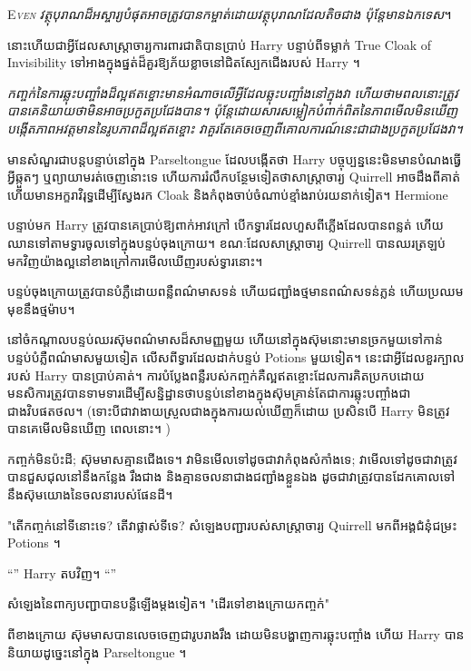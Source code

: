 
\lettrine{E}{\emph{ven}} \emph{វត្ថុបុរាណដ៏អស្ចារ្យបំផុតអាចត្រូវបានកម្ចាត់ដោយវត្ថុបុរាណដែលតិចជាង ប៉ុន្តែមានឯកទេស}។

នោះហើយជាអ្វីដែលសាស្រ្តាចារ្យការពារជាតិបានប្រាប់ Harry បន្ទាប់ពីទម្លាក់ True Cloak of Invisibility ទៅអាងក្នុងផ្នត់ដ៏គួរឱ្យភ័យខ្លាចនៅជិតស្បែកជើងរបស់ Harry ។

\emph{កញ្ចក់នៃការឆ្លុះបញ្ចាំងដ៏ល្អឥតខ្ចោះមានអំណាចលើអ្វីដែលឆ្លុះបញ្ចាំងនៅក្នុងវា ហើយថាមពលនោះត្រូវបានគេនិយាយថាមិនអាចប្រកួតប្រជែងបាន។ ប៉ុន្តែដោយសារសម្លៀកបំពាក់ពិតនៃភាពមើលមិនឃើញបង្កើតភាពអវត្ដមាននៃរូបភាពដ៏ល្អឥតខ្ចោះ វាគួរតែគេចចេញពីគោលការណ៍នេះជាជាងប្រកួតប្រជែងវា។}

មានសំណួរជាបន្តបន្ទាប់នៅក្នុង Parseltongue ដែលបង្កើតថា Harry បច្ចុប្បន្ននេះមិនមានបំណងធ្វើអ្វីឆ្កួតៗ ឬព្យាយាមរត់ចេញនោះទេ ហើយការរំលឹកបន្ថែមទៀតថាសាស្រ្តាចារ្យ Quirrell អាចដឹងពីគាត់ ហើយមានអក្ខរាវិរុទ្ធដើម្បីស្វែងរក Cloak និងកំពុងចាប់ចំណាប់ខ្មាំងរាប់រយនាក់ទៀត។ Hermione

បន្ទាប់មក Harry ត្រូវ​បាន​គេ​ប្រាប់​ឱ្យ​ពាក់​អាវ​ក្រៅ បើក​ទ្វារ​ដែល​ហួស​ពី​ភ្លើង​ដែល​បាន​ពន្លត់ ហើយ​ឈាន​ទៅ​តាម​ទ្វារ​ចូល​ទៅ​ក្នុង​បន្ទប់​ចុងក្រោយ។ ខណៈដែលសាស្រ្តាចារ្យ Quirrell បានឈរត្រឡប់មកវិញយ៉ាងល្អនៅខាងក្រៅការមើលឃើញរបស់ទ្វារនោះ។

បន្ទប់ចុងក្រោយត្រូវបានបំភ្លឺដោយពន្លឺពណ៌មាសទន់ ហើយជញ្ជាំងថ្មមានពណ៌សទន់ភ្លន់ ហើយប្រឈមមុខនឹងថ្មម៉ាប។

នៅចំកណ្តាលបន្ទប់ឈរស៊ុមពណ៌មាសដ៏សាមញ្ញមួយ ហើយនៅក្នុងស៊ុមនោះមានច្រកមួយទៅកាន់បន្ទប់បំភ្លឺពណ៌មាសមួយទៀត លើសពីទ្វារដែលដាក់បន្ទប់ Potions មួយទៀត។ នេះជាអ្វីដែលខួរក្បាលរបស់ Harry បានប្រាប់គាត់។ ការបំប្លែងពន្លឺរបស់កញ្ចក់គឺល្អឥតខ្ចោះដែលការគិតប្រកបដោយមនសិការត្រូវបានទាមទារដើម្បីសន្និដ្ឋានថាបន្ទប់នៅខាងក្នុងស៊ុមគ្រាន់តែជាការឆ្លុះបញ្ចាំងជាជាងវិបផតថល។ (ទោះបីជាវាងាយស្រួលជាងក្នុងការយល់ឃើញក៏ដោយ ប្រសិនបើ Harry មិនត្រូវបានគេមើលមិនឃើញ ពេលនោះ។ )

កញ្ចក់មិនប៉ះដី; ស៊ុមមាសគ្មានជើងទេ។ វាមិនមើលទៅដូចជាវាកំពុងសំកាំងទេ; វាមើលទៅដូចជាវាត្រូវបានជួសជុលនៅនឹងកន្លែង រឹងជាង និងគ្មានចលនាជាងជញ្ជាំងខ្លួនឯង ដូចជាវាត្រូវបានដែកគោលទៅនឹងស៊ុមយោងនៃចលនារបស់ផែនដី។

"តើកញ្ចក់នៅទីនោះទេ? តើវាផ្លាស់ទីទេ? សំឡេងបញ្ជារបស់សាស្រ្តាចារ្យ Quirrell មកពីអង្គជំនុំជម្រះ Potions ។

“” Harry តបវិញ។ “”

សំឡេងនៃពាក្យបញ្ជាបានបន្លឺឡើងម្តងទៀត។ "ដើរទៅខាងក្រោយកញ្ចក់"

ពីខាងក្រោយ ស៊ុមមាសបានលេចចេញជារូបរាងរឹង ដោយមិនបង្ហាញការឆ្លុះបញ្ចាំង ហើយ Harry បាននិយាយដូច្នេះនៅក្នុង Parseltongue ។

